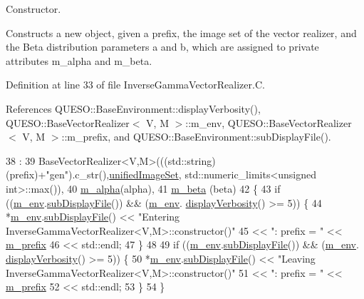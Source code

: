 Constructor. 

Constructs a new object, given a prefix, the image set of the vector realizer, and the Beta distribution parameters {\ttfamily a} and {\ttfamily b}, which are assigned to private attributes m\-\_\-alpha and m\-\_\-beta. 

Definition at line 33 of file Inverse\-Gamma\-Vector\-Realizer.\-C.



References Q\-U\-E\-S\-O\-::\-Base\-Environment\-::display\-Verbosity(), Q\-U\-E\-S\-O\-::\-Base\-Vector\-Realizer$<$ V, M $>$\-::m\-\_\-env, Q\-U\-E\-S\-O\-::\-Base\-Vector\-Realizer$<$ V, M $>$\-::m\-\_\-prefix, and Q\-U\-E\-S\-O\-::\-Base\-Environment\-::sub\-Display\-File().


\begin{DoxyCode}
38   :
39   BaseVectorRealizer<V,M>(((std::string)(prefix)+\textcolor{stringliteral}{"gen"}).c\_str(),\hyperlink{class_q_u_e_s_o_1_1_base_vector_realizer_ad958991bab8d6369e8a0d66b22a237d4}{unifiedImageSet},
      std::numeric\_limits<unsigned int>::max()),
40   \hyperlink{class_q_u_e_s_o_1_1_inverse_gamma_vector_realizer_aeb864c46df7833d3723b0df787e283ab}{m\_alpha}(alpha),
41   \hyperlink{class_q_u_e_s_o_1_1_inverse_gamma_vector_realizer_a23a2409ad76d55ec0734b9755bea7997}{m\_beta} (beta)
42 \{
43   \textcolor{keywordflow}{if} ((\hyperlink{class_q_u_e_s_o_1_1_base_vector_realizer_acde246c52f82d8ed687d91cfac14c29c}{m\_env}.\hyperlink{class_q_u_e_s_o_1_1_base_environment_a8a0064746ae8dddfece4229b9ad374d6}{subDisplayFile}()) && (\hyperlink{class_q_u_e_s_o_1_1_base_vector_realizer_acde246c52f82d8ed687d91cfac14c29c}{m\_env}.
      \hyperlink{class_q_u_e_s_o_1_1_base_environment_a1fe5f244fc0316a0ab3e37463f108b96}{displayVerbosity}() >= 5)) \{
44     *\hyperlink{class_q_u_e_s_o_1_1_base_vector_realizer_acde246c52f82d8ed687d91cfac14c29c}{m\_env}.\hyperlink{class_q_u_e_s_o_1_1_base_environment_a8a0064746ae8dddfece4229b9ad374d6}{subDisplayFile}() << \textcolor{stringliteral}{"Entering InverseGammaVectorRealizer<V,M>::constructor()"}
45                             << \textcolor{stringliteral}{": prefix = "} << \hyperlink{class_q_u_e_s_o_1_1_base_vector_realizer_ac5559b6921816ccaed7afc2d342c2a32}{m\_prefix}
46                             << std::endl;
47   \}
48 
49   \textcolor{keywordflow}{if} ((\hyperlink{class_q_u_e_s_o_1_1_base_vector_realizer_acde246c52f82d8ed687d91cfac14c29c}{m\_env}.\hyperlink{class_q_u_e_s_o_1_1_base_environment_a8a0064746ae8dddfece4229b9ad374d6}{subDisplayFile}()) && (\hyperlink{class_q_u_e_s_o_1_1_base_vector_realizer_acde246c52f82d8ed687d91cfac14c29c}{m\_env}.
      \hyperlink{class_q_u_e_s_o_1_1_base_environment_a1fe5f244fc0316a0ab3e37463f108b96}{displayVerbosity}() >= 5)) \{
50     *\hyperlink{class_q_u_e_s_o_1_1_base_vector_realizer_acde246c52f82d8ed687d91cfac14c29c}{m\_env}.\hyperlink{class_q_u_e_s_o_1_1_base_environment_a8a0064746ae8dddfece4229b9ad374d6}{subDisplayFile}() << \textcolor{stringliteral}{"Leaving InverseGammaVectorRealizer<V,M>::constructor()"}
51                             << \textcolor{stringliteral}{": prefix = "} << \hyperlink{class_q_u_e_s_o_1_1_base_vector_realizer_ac5559b6921816ccaed7afc2d342c2a32}{m\_prefix}
52                             << std::endl;
53   \}
54 \}
\end{DoxyCode}
